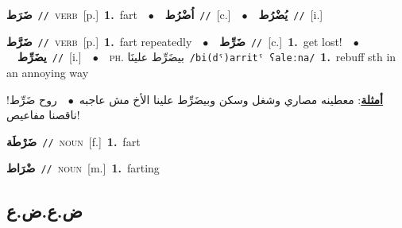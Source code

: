 \documentclass[10pt,a4paper,twoside]{article} %
\begin{document}
\begin{multicols}{2}
{\setlength\topsep{0pt}\textbf{\foreignlanguage{arabic}{ضَرَط}}\ {\color{gray}\texttt{//}\color{black}}\ \textsc{verb}\ [p.]\ \textbf{1.}~fart\ \ $\bullet$\ \ \setlength\topsep{0pt}\textbf{\foreignlanguage{arabic}{اُضْرُط}}\ {\color{gray}\texttt{//}\color{black}}\ [c.]\ \ $\bullet$\ \ \setlength\topsep{0pt}\textbf{\foreignlanguage{arabic}{يُضْرُط}}\ {\color{gray}\texttt{//}\color{black}}\ [i.]\ } \vspace{2mm}

{\setlength\topsep{0pt}\textbf{\foreignlanguage{arabic}{ضَرَّط}}\ {\color{gray}\texttt{//}\color{black}}\ \textsc{verb}\ [p.]\ \textbf{1.}~fart repeatedly\ \ $\bullet$\ \ \setlength\topsep{0pt}\textbf{\foreignlanguage{arabic}{ضَرِّط}}\ {\color{gray}\texttt{//}\color{black}}\ [c.]\ \textbf{1.}~get lost!\ \ $\bullet$\ \ \setlength\topsep{0pt}\textbf{\foreignlanguage{arabic}{يضَرِّط}}\ {\color{gray}\texttt{//}\color{black}}\ [i.]\ \ $\bullet$\ \ \textsc{ph.} \color{gray} \foreignlanguage{arabic}{بيضَرِّط علينَا}\color{black}\ {\color{gray}\texttt{/{\sffamily bi(dˤ)arritˤ ʕaleːna}/}\color{black}}\ \textbf{1.}~rebuff sth in an annoying way\  \begin{flushright}\color{gray}\foreignlanguage{arabic}{\textbf{\underline{\foreignlanguage{arabic}{أمثلة}}}: معطينه مصاري وشغل وسكن وبيضَرِّط علينا الأخ مش عاجبه\ $\bullet$\ \  روح ضَرِّط! ناقصنا مفاعيص!}\end{flushright}\color{black}} \vspace{2mm}

{\setlength\topsep{0pt}\textbf{\foreignlanguage{arabic}{ضَرْطَة}}\ {\color{gray}\texttt{//}\color{black}}\ \textsc{noun}\ [f.]\ \textbf{1.}~fart\ } \vspace{2mm}

{\setlength\topsep{0pt}\textbf{\foreignlanguage{arabic}{ضْرَاط}}\ {\color{gray}\texttt{//}\color{black}}\ \textsc{noun}\ [m.]\ \textbf{1.}~farting\ } \vspace{2mm}

\vspace{-3mm}
\subsection*{\color{blue}\foreignlanguage{arabic}{ض.ع.ض.ع}\color{blue}{}} 


\end{multicols}
\end{document}
